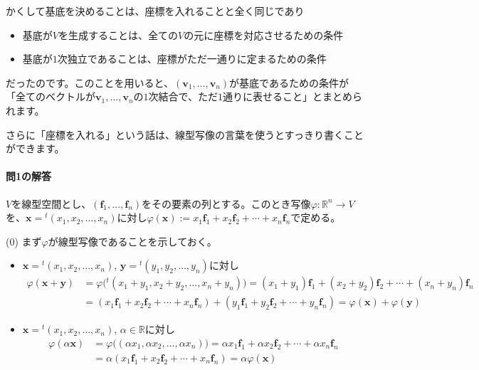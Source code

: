 かくして基底を決めることは、座標を入れることと全く同じであり
\begin{itemize}
\item 基底が$V$を生成することは、全ての$V$の元に座標を対応させるための条件
\item 基底が$1$次独立であることは、座標がただ一通りに定まるための条件
\end{itemize}
だったのです。このことを用いると、$(\bm{v}_1, \ldots, \bm{v}_n)$が基底であるための条件が「全てのベクトルが$\bm{v}_1,\ldots,\bm{v}_n$の$1$次結合で、ただ$1$通りに表せること」とまとめられます。

さらに「座標を入れる」という話は、線型写像の言葉を使うとすっきり書くことができます。


\paragraph{問1の解答}

$V$を線型空間とし、$(\bm{f}_1, \ldots, \bm{f}_n)$をその要素の列とする。このとき写像$\varphi\colon\mathbb{R}^n \rightarrow V$を、$\bm{x} = {}^t(x_1, x_2, \ldots, x_n)$に対し$\varphi(\bm{x}) := x_1\bm{f}_1 + x_2\bm{f}_2 + \cdots + x_n \bm{f}_n$で定める。

\noindent (0) まず$\varphi$が線型写像であることを示しておく。
\begin{itemize}
\item $\bm{x} = {}^t(x_1, x_2, \ldots, x_n)$, $\bm{y} = {}^t(y_1, y_2, \ldots, y_n)$に対し
\begin{align*}
\varphi(\bm{x} + \bm{y}) &= \varphi\bigl({}^t(x_1 + y_1, x_2 + y_2, \ldots, x_n + y_n)\bigr)
=(x_1 + y_1)\bm{f}_1 + (x_2 + y_2)\bm{f}_2 + \cdots + (x_n + y_n) \bm{f}_n \\
&= (x_1 \bm{f}_1 + x_2 \bm{f}_2 + \cdots + x_n \bm{f}_n) + (y_1 \bm{f}_1 + y_2 \bm{f}_2 + \cdots + y_n \bm{f}_n)
= \varphi(\bm{x}) + \varphi(\bm{y})
\end{align*}
\item $\bm{x} = {}^t(x_1, x_2, \ldots, x_n)$, $\alpha\in\mathbb{R}$に対し
\begin{align*}
\varphi(\alpha\bm{x})
&= \varphi\bigl((\alpha x_1, \alpha x_2, \ldots, \alpha x_n)\bigr)
= \alpha x_1 \bm{f}_1 + \alpha x_2 \bm{f}_2 + \cdots + \alpha x_n \bm{f}_n \\
&= \alpha(x_1 \bm{f}_1 + x_2 \bm{f}_2 + \cdots + x_n \bm{f}_n) = \alpha \varphi(\bm{x})
\end{align*}
\end{itemize}

